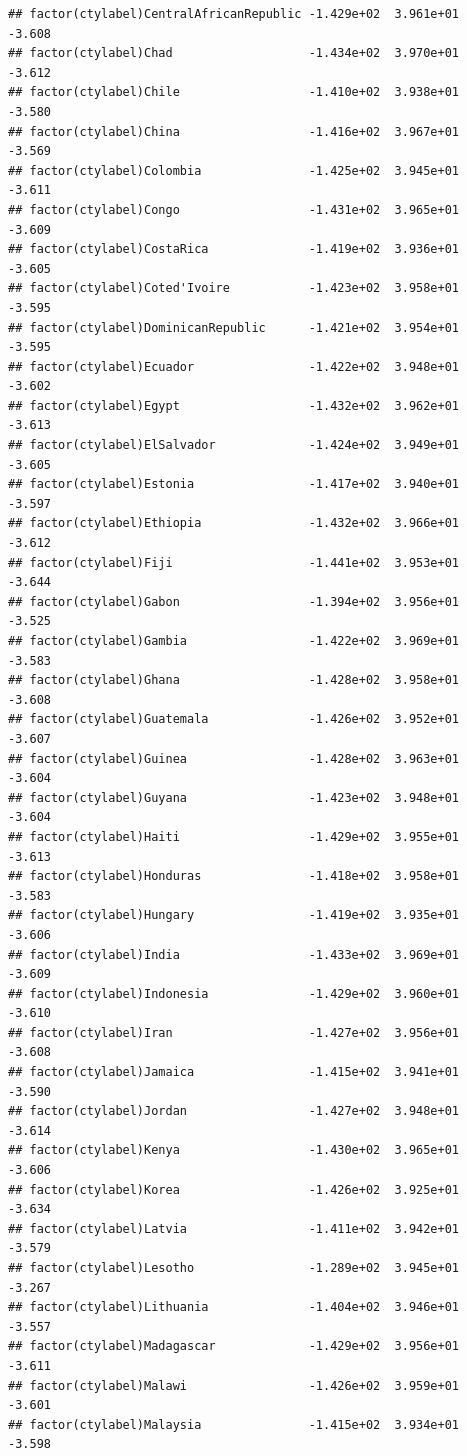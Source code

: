 \documentclass[12pt]{article}\usepackage[]{graphicx}\usepackage[]{color}
\makeatletter
\newenvironment{kframe}{%
 \def\at@end@of@kframe{}%
 \ifinner\ifhmode%
  \def\at@end@of@kframe{\end{minipage}}%
  \begin{minipage}{\columnwidth}%
 \fi\fi%
 \def\FrameCommand##1{\hskip\@totalleftmargin \hskip-\fboxsep
 \colorbox{shadecolor}{##1}\hskip-\fboxsep
     \hskip-\linewidth \hskip-\@totalleftmargin \hskip\columnwidth}%
 \MakeFramed {\advance\hsize-\width
   \@totalleftmargin\z@ \linewidth\hsize
   \@setminipage}}%
 {\par\unskip\endMakeFramed%
 \at@end@of@kframe}
\newenvironment{knitrout}{}{} %
\makeatother
\begin{document}
\begin{knitrout}
\begin{kframe}
\begin{verbatim}
## factor(ctylabel)CentralAfricanRepublic -1.429e+02  3.961e+01  -3.608
## factor(ctylabel)Chad                   -1.434e+02  3.970e+01  -3.612
## factor(ctylabel)Chile                  -1.410e+02  3.938e+01  -3.580
## factor(ctylabel)China                  -1.416e+02  3.967e+01  -3.569
## factor(ctylabel)Colombia               -1.425e+02  3.945e+01  -3.611
## factor(ctylabel)Congo                  -1.431e+02  3.965e+01  -3.609
## factor(ctylabel)CostaRica              -1.419e+02  3.936e+01  -3.605
## factor(ctylabel)Coted'Ivoire           -1.423e+02  3.958e+01  -3.595
## factor(ctylabel)DominicanRepublic      -1.421e+02  3.954e+01  -3.595
## factor(ctylabel)Ecuador                -1.422e+02  3.948e+01  -3.602
## factor(ctylabel)Egypt                  -1.432e+02  3.962e+01  -3.613
## factor(ctylabel)ElSalvador             -1.424e+02  3.949e+01  -3.605
## factor(ctylabel)Estonia                -1.417e+02  3.940e+01  -3.597
## factor(ctylabel)Ethiopia               -1.432e+02  3.966e+01  -3.612
## factor(ctylabel)Fiji                   -1.441e+02  3.953e+01  -3.644
## factor(ctylabel)Gabon                  -1.394e+02  3.956e+01  -3.525
## factor(ctylabel)Gambia                 -1.422e+02  3.969e+01  -3.583
## factor(ctylabel)Ghana                  -1.428e+02  3.958e+01  -3.608
## factor(ctylabel)Guatemala              -1.426e+02  3.952e+01  -3.607
## factor(ctylabel)Guinea                 -1.428e+02  3.963e+01  -3.604
## factor(ctylabel)Guyana                 -1.423e+02  3.948e+01  -3.604
## factor(ctylabel)Haiti                  -1.429e+02  3.955e+01  -3.613
## factor(ctylabel)Honduras               -1.418e+02  3.958e+01  -3.583
## factor(ctylabel)Hungary                -1.419e+02  3.935e+01  -3.606
## factor(ctylabel)India                  -1.433e+02  3.969e+01  -3.609
## factor(ctylabel)Indonesia              -1.429e+02  3.960e+01  -3.610
## factor(ctylabel)Iran                   -1.427e+02  3.956e+01  -3.608
## factor(ctylabel)Jamaica                -1.415e+02  3.941e+01  -3.590
## factor(ctylabel)Jordan                 -1.427e+02  3.948e+01  -3.614
## factor(ctylabel)Kenya                  -1.430e+02  3.965e+01  -3.606
## factor(ctylabel)Korea                  -1.426e+02  3.925e+01  -3.634
## factor(ctylabel)Latvia                 -1.411e+02  3.942e+01  -3.579
## factor(ctylabel)Lesotho                -1.289e+02  3.945e+01  -3.267
## factor(ctylabel)Lithuania              -1.404e+02  3.946e+01  -3.557
## factor(ctylabel)Madagascar             -1.429e+02  3.956e+01  -3.611
## factor(ctylabel)Malawi                 -1.426e+02  3.959e+01  -3.601
## factor(ctylabel)Malaysia               -1.415e+02  3.934e+01  -3.598

\end{verbatim}
\end{kframe}
\end{knitrout}
\end{document}
